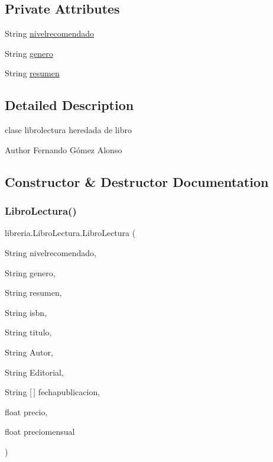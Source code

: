\subsection*{Private Attributes}
\begin{DoxyCompactItemize}
\item 
String \mbox{\hyperlink{classlibreria_1_1_libro_lectura_a4a163e246538be335d80d56a699bde4c}{nivelrecomendado}}
\item 
String \mbox{\hyperlink{classlibreria_1_1_libro_lectura_a165e12f15d25aab5fd957ebf42ad9458}{genero}}
\item 
String \mbox{\hyperlink{classlibreria_1_1_libro_lectura_aadbf8eecd32ed6a6dee9202873762707}{resumen}}
\end{DoxyCompactItemize}


\subsection{Detailed Description}
clase librolectura heredada de libro \begin{DoxyAuthor}{Author}
Fernando Gómez Alonso 
\end{DoxyAuthor}


\subsection{Constructor \& Destructor Documentation}
\mbox{\label{classlibreria_1_1_libro_lectura_a34f8c88ca70b9ce47cfa135888e32d51}} 
\subsubsection{\texorpdfstring{Libro\+Lectura()}{LibroLectura()}}
{\footnotesize\ttfamily libreria.\+Libro\+Lectura.\+Libro\+Lectura (\begin{DoxyParamCaption}\item[{String}]{nivelrecomendado,  }\item[{String}]{genero,  }\item[{String}]{resumen,  }\item[{String}]{isbn,  }\item[{String}]{titulo,  }\item[{String}]{Autor,  }\item[{String}]{Editorial,  }\item[{String \mbox{[}$\,$\mbox{]}}]{fechapublicacion,  }\item[{float}]{precio,  }\item[{float}]{preciomensual }\end{DoxyParamCaption})\hspace{0.3cm}{\ttfamily [inline]}}

